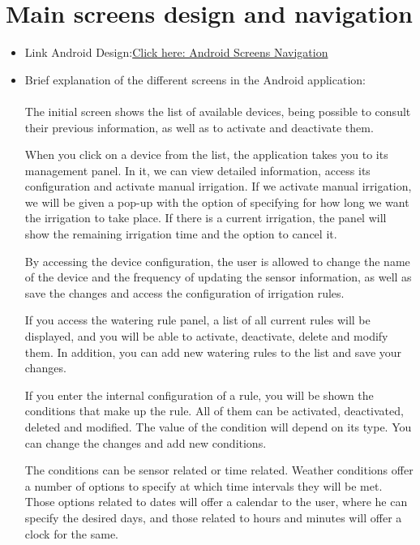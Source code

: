 \documentclass[11pt,a4paper]{article}
\begin{document}
\section{Main screens design and navigation}
\begin{itemize}
\item Link Android Design:\newline\newline \textcolor{blue}{\href{https://drive.google.com/open?id=1366cBxw7umuTSoKkzeMvzVouD4csthgp}{Click here: Android Screens Navigation}}

\item Brief explanation of the different screens in the Android application: 
\\ \\
The initial screen shows the list of available devices, being possible to consult their previous information, as well as to activate and deactivate them. 

When you click on a device from the list, the application takes you to its management panel. In it, we can view detailed information, access its configuration and activate manual irrigation. If we activate manual irrigation, we will be given a pop-up with the option of specifying for how long we want the irrigation to take place. If there is a current irrigation, the panel will show the remaining irrigation time and the option to cancel it. 

By accessing the device configuration, the user is allowed to change the name of the device and the frequency of updating the sensor information, as well as save the changes and access the configuration of irrigation rules. 

If you access the watering rule panel, a list of all current rules will be displayed, and you will be able to activate, deactivate, delete and modify them. In addition, you can add new watering rules to the list and save your changes.  

If you enter the internal configuration of a rule, you will be shown the conditions that make up the rule. All of them can be activated, deactivated, deleted and modified. The value of the condition will depend on its type. You can change the changes and add new conditions. 

The conditions can be sensor related or time related. Weather conditions offer a number of options to specify at which time intervals they will be met. Those options related to dates will offer a calendar to the user, where he can specify the desired days, and those related to hours and minutes will offer a clock for the same. 


\end{itemize}
\end{document}
